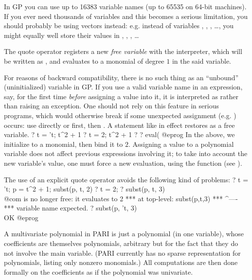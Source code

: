 In GP you can use up to 16383 variable names (up to 65535 on 64-bit
machines). If you ever need thousands of variables and this becomes a serious
limitation, you should probably be using vectors instead: e.g. instead of
variables , , , \dots, you might equally well store
their values in , , , \dots

The quote operator  registers a new \emph{free variable} with the
interpreter, which will be written as , and evaluates to a monomial
of degree $1$ in the said variable.

For reasons of backward compatibility, there is no such thing as an
``unbound'' (uninitialized) variable in GP. If you use a valid variable name
in an expression,  say, for the first time \emph{before} assigning a
value into it, it is interpreted as  rather than raising an
exception. One should not rely on this feature in serious programs, which
would otherwise break if some unexpected assignment (e.g. )
occurs: use  directly or  first, then .
A statement like  in effect restores  as a free variable.
%
\bprog
? t = 't; t^2 + 1
? t = 2; t^2 + 1
? %
? eval(%
@eprog\noindent
In the above, we initialize  to a monomial, then bind it to $2$.
Assigning a value to a polynomial variable does not affect previous
expressions involving it; to take into account the new variable's value, one
must force a new evaluation, using the function  (see
).

The use of an explicit quote operator avoids the following kind of problems:
\bprog
? t = 't; p = t^2 + 1; subst(p, t, 2)
? t = 2;
? subst(p, t, 3)    \\@com {} is no longer free: it evaluates to 2
  ***   at top-level: subst(p,t,3)
  ***                         ^----
  ***   variable name expected.
? subst(p, 't, 3)   \\ OK
@eprog

\label{se:priority}
A multivariate polynomial in PARI is just a polynomial (in one variable),
whose coefficients are themselves polynomials, arbitrary but for the fact
that they do not involve the main variable. (PARI currently has no sparse
representation for polynomials, listing only nonzero monomials.) All
computations are then done formally on the coefficients as if the
polynomial was univariate.

